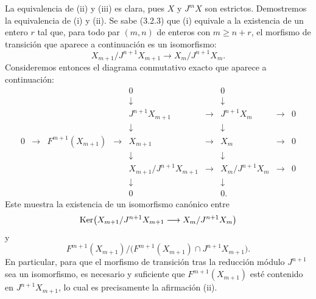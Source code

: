 \begin{prooftext}
La equivalencia de (ii) y (iii) es clara, pues \(X\) y \(J^mX\) son estrictos. Demostremos la equivalencia de (i) y (ii). Se sabe (3.2.3) que (i) equivale a la existencia de un entero \(r\) tal que, para todo par \((m,n)\) de enteros con \(m\ge n+r\), el morfismo de transición que aparece a continuación es un isomorfismo:
\[
X_{m+1}/J^{n+1}X_{m+1}\longrightarrow X_m/J^{n+1}X_m.
\]
Consideremos entonces el diagrama conmutativo exacto que aparece a continuación:
\[
\begin{array}{ccccccccccc}
&&&&0&&0\\
&&&&\downarrow&&\downarrow\\
&&&&J^{n+1}X_{m+1}&\longrightarrow&J^{n+1}X_m&\longrightarrow&0\\
&&&&\downarrow&&\downarrow\\
0&\longrightarrow&F^{m+1}(X_{m+1})&\longrightarrow&X_{m+1}&\longrightarrow&X_m&\longrightarrow&0\\
&&&&\downarrow&&\downarrow\\
&&&&X_{m+1}/J^{n+1}X_{m+1}&\longrightarrow&X_m/J^{n+1}X_m&\longrightarrow&0\\
&&&&\downarrow&&\downarrow\\
&&&&0&&0 .
\end{array}
\]
Este muestra la existencia de un isomorfismo canónico entre
\[
\operatorname{Ker}\bigl(X_{m+1}/J^{n+1}X_{m+1}
       \longrightarrow X_m/J^{n+1}X_m\bigr)
\]
y
\[
F^{m+1}(X_{m+1})/
\bigl(F^{m+1}(X_{m+1})\cap J^{n+1}X_{m+1}\bigr).
\]
En particular, para que el morfismo de transición tras la reducción módulo \(J^{n+1}\) sea un isomorfismo, es necesario y suficiente que \(F^{m+1}(X_{m+1})\) esté contenido en \(J^{n+1}X_{m+1}\), lo cual es precisamente la afirmación (ii).
\end{prooftext}
